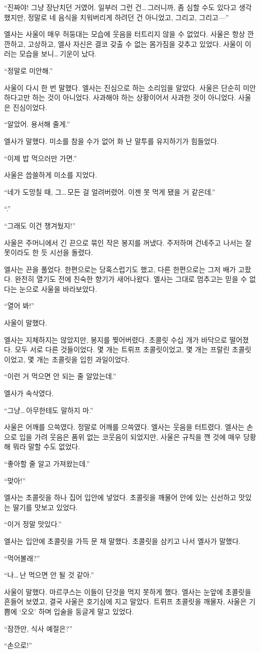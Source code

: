 ``진짜야! 그냥 장난치던 거였어. 일부러 그런 건\ldots\,그러니까, 좀 심할 수도 있다고 생각했지만, 정말로 네 음식을 치워버리게 하려던 건 아니었고, 그리고, 그리고—''

엘사는 사울이 매우 허둥대는 모습에 웃음을 터트리지 않을 수 없었다. 사울은 항상 깐깐하고, 고상하고, 엘사 자신은 결코 갖출 수 없는 몸가짐을 갖추고 있었다. 사울이 이러는 모습을 보니\ldots\,기운이 났다.

``정말로 미안해.''

사울이 다시 한 번 말했다. 엘사는 진심으로 하는 소리임을 알았다. 사울은 단순히 미안하다고만 하는 것이 아니었다. 사과해야 하는 상황이어서 사과한 것이 아니었다. 사울은 진심이었다.

``알았어. 용서해 줄게.''

엘사가 말했다. 미소를 참을 수가 없어 화 난 말투를 유지하기가 힘들었다.

``이제 밥 먹으러만 가면.''

사울은 씁쓸하게 미소를 지었다.

``네가 도망칠 때, 그\ldots\,모든 걸 얼려버렸어. 이젠 못 먹게 됐을 거 같은데.''

``.''

``그래도 이건 챙겨뒀지!''

사울은 주머니에서 긴 끈으로 묶인 작은 봉지를 꺼냈다. 주저하며 건네주고 나서는 잘못이라도 한 듯 시선을 돌렸다.

엘사는 끈을 풀었다. 한편으로는 당혹스럽기도 했고, 다른 한편으로는 그저 배가 고팠다. 완전히 열기도 전에 친숙한 향기가 새어나왔다. 엘사는 그대로 멈추고는 믿을 수 없다는 눈으로 사울을 바라보았다.

``열어 봐!''

사울이 말했다.

엘사는 지체하지는 않았지만, 봉지를 찢어버렸다. 초콜릿 수십 개가 바닥으로 떨어졌다. 모두 서로 다른 것들이었다. 몇 개는 트뤼프 초콜릿이었고, 몇 개는 프랄린 초콜릿이었고, 몇 개는 초콜릿을 입힌 과일이었다.

``이런 거 먹으면 안 되는 줄 알았는데.''

엘사가 속삭였다.

``그냥\ldots\,아무한테도 말하지 마.''

사울은 어깨를 으쓱였다. 정말로 어깨를 으쓱였다. 엘사는 웃음을 터트렸다. 엘사는 손으로 입을 가려 웃음은 품위 없는 코웃음이 되었지만, 사울은 규칙을 깬 것에 매우 당황해 뭐라 말할 수도 없었다.

``좋아할 줄 알고 가져왔는데.''

``맞아!''

엘사는 초콜릿을 하나 집어 입안에 넣었다. 초콜릿을 깨물어 안에 있는 신선하고 맛있는 딸기를 맛보고 있었다.

``이거 정말 맛있다.''

엘사는 입안에 초콜릿을 가득 문 채 말했다. 초콜릿을 삼키고 나서 엘사가 말했다.

``먹어볼래?''

``나\ldots\,난 먹으면 안 될 것 같아.''

사울이 말했다. 마르쿠스는 이들이 단것을 먹지 못하게 했다. 엘사는 눈앞에 초콜릿을 흔들어 보였고, 결국 사울은 호기심에 지고 말았다. 트뤼프 초콜릿을 깨물자, 사울은 기쁨에 `오오' 하며 입술을 둥글게 말고 있었다.

``잠깐만, 식사 예절은?''

``손으로!''

